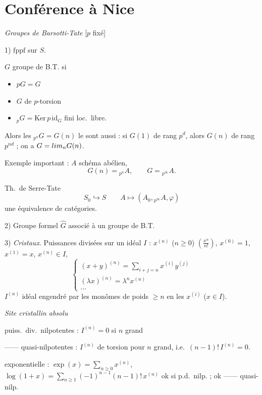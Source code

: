 \documentclass[11pt,a4paper]{article}
\begin{document}
\section{Conférence à Nice}


\emph{Groupes de Barsotti-Tate} [$p$ fixé]

1) $\mathrm{fppf}$ sur $S$.

$G$ groupe de B.T. si
\begin{itemize}
  \item[a)] $pG = G$
  \item[b)] $G$ de $p$-torsion
  \item[c)] ${}_pG = \mathrm{Ker}\, p\,\mathrm{id}_G$ fini loc.\ libre.
\end{itemize}

Alors les ${}_{p^n}G = G(n)$ le sont aussi : si $G(1)$ de rang $p^d$, alors
$G(n)$ de rang $p^{nd}$ ; on a $G = \varinjlim_n G(n)$.

Exemple important : $A$ schéma abélien,
\[
G(n) = {}_{p^n}A, \qquad G = {}_{p^\infty}A .
\]

 Th.\ de Serre-Tate
\[
S_0 \hookrightarrow S \qquad A \longmapsto (A_0, {}_{p^\infty}A, \varphi)
\]
une équivalence de catégories.

2) Groupe formel $\widehat{G}$ associé à un groupe de B.T.

3) \emph{Cristaux}. Puissances divisées sur un idéal $I$ :
$x^{(n)}$ ($n \geq 0$) $\left(\frac{x^n}{n!}\right)$, \quad
$x^{(0)} = 1$, $x^{(1)} = x$, $x^{(n)} \in I$,
\[
\left\lbrace
\begin{array}{l}
(x+y)^{(n)} = \sum_{i+j=n} x^{(i)} y^{(j)} \\
(\lambda x)^{(n)} = \lambda^n x^{(n)} \\
\dots
\end{array}\right.
\]
$I^{(n)}$ idéal \struck{\ill{}} engendré par les monômes de poids $\geq n$
en les $x^{(i)}$ ($x \in I$).

\emph{Site cristallin absolu} \struck{\ill{}}

puiss.\ div.\ nilpotentes : $I^{(n)} = 0$ si $n$ grand

—— quasi-nilpotentes : $I^{(n)}$ de torsion pour $n$ grand, i.e.\
$(n-1)!\, I^{(n)} = 0$.

exponentielle : $\exp(x) = \sum_{n \geq 0} x^{(n)}$, \quad
$\log(1+x) = \sum_{n \geq 1} (-1)^{n-1} (n-1)!\, x^{(n)}$ \quad ok si p.d.\
nilp. ; ok —— quasi-nilp.
\end{document}
